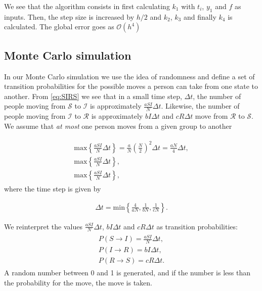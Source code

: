 \documentclass[../main.tex]{subfiles}
\begin{document}
We see that the algorithm consists in first calculating $k_1$ with $t_i$, $y_1$ and $f$ as inputs. Then, the step size is increased by \ensuremath{h/2} and $k_2$, $k_3$ and finally $k_4$ is calculated. The global error goes as \ensuremath{\mathcal{O}(h^4)}

\subsection{Monte Carlo simulation}
In our Monte Carlo simulation we use the idea of randomness and define a set of transition probabilities for the possible moves a person can take from one state to another. From \cref{eq:SIRS} we see that in a small time step, \ensuremath{\Delta t}, the number of people moving from \ensuremath{\mathcal{S}} to \ensuremath{\mathcal{I}} is approximately \ensuremath{\frac{aSI}{N}\Delta t}. Likewise, the number of people moving from \ensuremath{\mathcal{I}} to \ensuremath{\mathcal{R}} is approximately \ensuremath{bI\Delta t} and \ensuremath{cR\Delta t} move from \ensuremath{\mathcal{R}} to \ensuremath{\mathcal{S}}. We assume that \textit{at most} one person moves from a given group to another

\begin{align}
\begin{split}
    \text{max}\left\{ \frac{aSI}{N}\Delta t\right\}=\frac{a}{N}\left(\frac{N}{2}\right)^2\Delta t=\frac{aN}{4}\Delta t, \\
    \text{max}\left\{ \frac{aSI}{N}\Delta t\right\}, \\
    \text{max}\left\{ \frac{aSI}{N}\Delta t\right\}, 
\end{split}
\end{align} where the time step is given by

\begin{align}
    \Delta t= \text{min} \left\{ \frac{4}{aN}, \frac{1}{bN}, \frac{1}{cN} \right\}.
\end{align}

We reinterpret the values \ensuremath{\frac{aSI}{N}\Delta t}, \ensuremath{bI\Delta t} and \ensuremath{cR\Delta t} as transition probabilities: 
\begin{align}
    \begin{split}
        P(S\rightarrow I) = \frac{aSI}{N}\Delta t,\\
        P(I\rightarrow R) = bI\Delta t, \\
        P(R\rightarrow S) = cR\Delta t.  
    \end{split}
\end{align} A random number between 0 and 1 is generated, and if the number is less than the probability for the move, the move is taken. 
\end{document}

